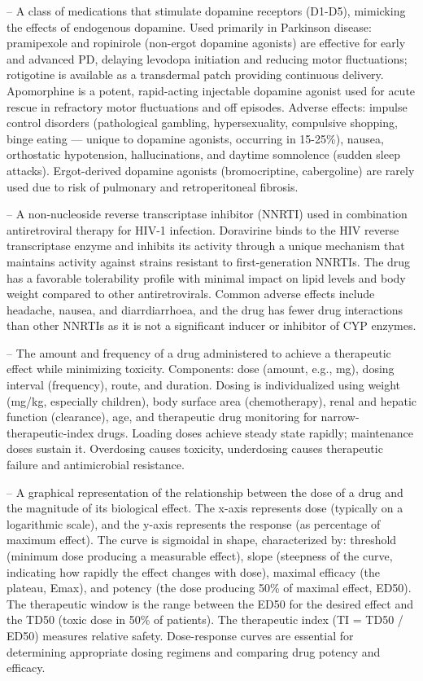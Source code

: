 -- A class of medications that stimulate dopamine receptors (D1-D5), mimicking the effects of endogenous dopamine. Used primarily in Parkinson disease: pramipexole and ropinirole (non-ergot dopamine agonists) are effective for early and advanced PD, delaying levodopa initiation and reducing motor fluctuations; rotigotine is available as a transdermal patch providing continuous delivery. Apomorphine is a potent, rapid-acting injectable dopamine agonist used for acute rescue in refractory motor fluctuations and off episodes. Adverse effects: impulse control disorders (pathological gambling, hypersexuality, compulsive shopping, binge eating — unique to dopamine agonists, occurring in 15-25\%), nausea, orthostatic hypotension, hallucinations, and daytime somnolence (sudden sleep attacks). Ergot-derived dopamine agonists (bromocriptine, cabergoline) are rarely used due to risk of pulmonary and retroperitoneal fibrosis.

-- A non-nucleoside reverse transcriptase inhibitor (NNRTI) used in combination antiretroviral therapy for HIV-1 infection. Doravirine binds to the HIV reverse transcriptase enzyme and inhibits its activity through a unique mechanism that maintains activity against strains resistant to first-generation NNRTIs. The drug has a favorable tolerability profile with minimal impact on lipid levels and body weight compared to other antiretrovirals. Common adverse effects include headache, nausea, and diarrdiarrhoea, and the drug has fewer drug interactions than other NNRTIs as it is not a significant inducer or inhibitor of CYP enzymes.

-- The amount and frequency of a drug administered to achieve a therapeutic effect while minimizing toxicity. Components: dose (amount, e.g., mg), dosing interval (frequency), route, and duration. Dosing is individualized using weight (mg/kg, especially children), body surface area (chemotherapy), renal and hepatic function (clearance), age, and therapeutic drug monitoring for narrow-therapeutic-index drugs. Loading doses achieve steady state rapidly; maintenance doses sustain it. Overdosing causes toxicity, underdosing causes therapeutic failure and antimicrobial resistance.

-- A graphical representation of the relationship between the dose of a drug and the magnitude of its biological effect. The x-axis represents dose (typically on a logarithmic scale), and the y-axis represents the response (as percentage of maximum effect). The curve is sigmoidal in shape, characterized by: threshold (minimum dose producing a measurable effect), slope (steepness of the curve, indicating how rapidly the effect changes with dose), maximal efficacy (the plateau, Emax), and potency (the dose producing 50\% of maximal effect, ED50). The therapeutic window is the range between the ED50 for the desired effect and the TD50 (toxic dose in 50\% of patients). The therapeutic index (TI = TD50 / ED50) measures relative safety. Dose-response curves are essential for determining appropriate dosing regimens and comparing drug potency and efficacy.

